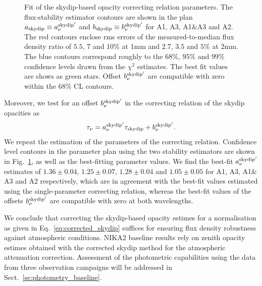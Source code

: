 \begin{figure}[ht!]
\begin{center}
    \caption[NIKA2 skydip-based opacity correcting
    relation]{Fit of the skydip-based opacity correcting relation
    parameters.
    The flux-stability estimator contours are shown in the plan
    $a_{\rm{skydip}} \equiv a_\nu^{\rm{skydip}'}$ and
    $b_{\rm{skydip}} \equiv b_\nu^{\rm{skydip}'}$
    for A1, A3, A1$\&$A3 and A2.
    The red contours enclose rms
    errors of the measured-to-median flux density ratio of $5.5$, $7$
    and $10\%$ at 1mm and $2.7$, $3.5$ and $5\%$ at 2mm. The blue
    contours correspond roughly to the $68\%$, $95\%$ and $99\%$
    confidence levels drawn from the $\chi^2$ estimates.
    The best fit values are shows as green stars. Offset
    $b_\nu^{\rm{skydip}'}$ are compatible with zero within the $68\%$
    CL contours.} 
\label{fig:skydip_fit}
\end{center}
\end{figure}

Moreover, we test for an offset $b_\nu^{\rm{skydip}'}$ in the
correcting relation of the skydip opacities as 
\begin{equation}  
  \tau_\nu =  a_\nu^{\rm{skydip}'}\tau_{\rm{skydip}} + b_\nu^{\rm{skydip}'}.      
\end{equation}
We repeat the estimation of the parameters of the correcting
relation. Confidence level contours in the parameter plan using the
two stability estimators are skown in Fig.~\ref{fig:skydip_fit}, as
well as the
best-fitting parameter values.
We find the best-fit $a_\nu^{\rm{skydip}'}$ estimates of
$1.36 \pm 0.04$,
$1.25 \pm 0.07$,
$1.28 \pm 0.04$ and
$1.05 \pm 0.05$ for A1, A3, A1$\&$A3 and A2 respectively, which are in
agreement with the best-fit values estimated using the single-parameter
correcting relation, whereas the best-fit values of the offsets
$b_\nu^{\rm{skydip}'}$ are compatible with zero at both wavelengths.

We conclude that correcting the skydip-based opacity estimes for a
normalisation as given in Eq.~\ref{eq:corrected_skydip} suffices for
ensuring flux density robustness against atmospheric conditions.
NIKA2 baseline results rely on zenith opacity estimes obtained with
the corrected skydip method for the atmospheric attenuation
correction. Assessment of the photometric capabilities using the data
from three observation campaigns will be addressed in
Sect.~\ref{se:photometry_baseline}.


